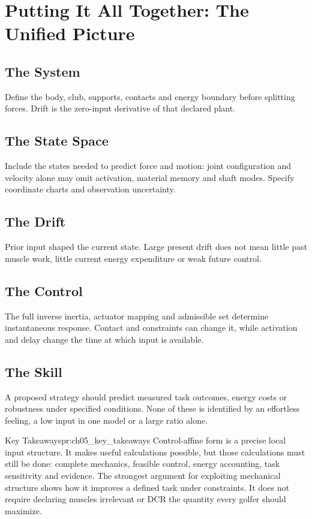 \section{Putting It All Together: The Unified Picture}
\subsection*{The System}
Define the body, club, supports, contacts and energy boundary before splitting forces. Drift is the zero-input derivative of that declared plant.
\subsection*{The State Space}
Include the states needed to predict force and motion: joint configuration and velocity alone may omit activation, material memory and shaft modes. Specify coordinate charts and observation uncertainty.
\subsection*{The Drift}
Prior input shaped the current state. Large present drift does not mean little past muscle work, little current energy expenditure or weak future control.
\subsection*{The Control}
The full inverse inertia, actuator mapping and admissible set determine instantaneous response. Contact and constraints can change it, while activation and delay change the time at which input is available.
\subsection*{The Skill}
A proposed strategy should predict measured task outcomes, energy costs or robustness under specified conditions. None of these is identified by an effortless feeling, a low input in one model or a large ratio alone.

\begin{principle}{Key Takeaways}{pr:ch05_key_takeaways}
Control-affine form is a precise local input structure. It makes useful calculations possible, but those calculations must still be done: complete mechanics, feasible control, energy accounting, task sensitivity and evidence. The strongest argument for exploiting mechanical structure shows how it improves a defined task under constraints. It does not require declaring muscles irrelevant or DCR the quantity every golfer should maximize.
\end{principle}



